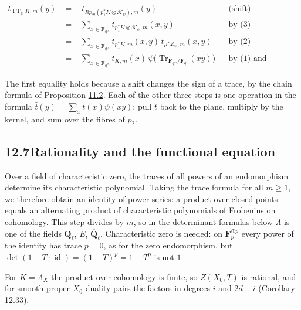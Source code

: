 \documentclass[11pt]{article}
\begin{document}
\[
\begin{aligned}
t_{\operatorname{FT}_\psi K,m}(y)
&=-\,t_{Rp_{2!}(p_1^*K\otimes\mathcal K_\psi),m}(y)
&&\text{(shift)}\\
&=-\sum_{x\in\mathbf F_{q^m}}t_{p_1^*K\otimes\mathcal K_\psi,m}(x,y)
&&\text{by (3)}\\
&=-\sum_{x\in\mathbf F_{q^m}}t_{p_1^*K,m}(x,y)\,t_{\mu^*\mathcal L_\psi,m}(x,y)
&&\text{by (2)}\\
&=-\sum_{x\in\mathbf F_{q^m}}t_{K,m}(x)\,
\psi\bigl(\operatorname{Tr}_{\mathbf F_{q^m}/\mathbf F_q}(xy)\bigr)
&&\text{by (1) and Lemma~16.1.1.}
\end{aligned}
\]

The first equality holds because a shift changes the sign of a trace, by the chain formula of Proposition \hyperref[bp176]{11.2}. Each of the other three steps is one operation in the formula \(\hat t(y)=\sum_xt(x)\psi(xy)\): pull \(t\) back to the plane, multiply by the kernel, and sum over the fibres of \(p_2\).


\subsection*{\texorpdfstring{12.7\quad Rationality and the functional equation}{12.7 Rationality and the functional equation}}
\label{bp312}%
\label{bp313}%
Over a field of characteristic zero, the traces of all powers of an endomorphism determine its characteristic polynomial. Taking the trace formula for all \(m\geq1\), we therefore obtain an identity of power series: a product over closed points equals an alternating product of characteristic polynomials of Frobenius on cohomology. This step divides by \(m\), so in the determinant formulas below \(\Lambda\) is one of the fields \(\mathbf Q_\ell\), \(E\), \(\overline{\mathbf Q}_\ell\). Characteristic zero is needed: on \(\mathbf F_p^{\oplus p}\) every power of the identity has trace \(p=0\), as for the zero endomorphism, but \(\det(1-T\cdot\operatorname{id})=(1-T)^p=1-T^p\) is not \(1\).

For \(K=\Lambda_X\) the product over cohomology is finite, so \(Z(X_0,T)\) is rational, and for smooth proper \(X_0\) duality pairs the factors in degrees \(i\) and \(2d-i\) (Corollary \hyperref[bp325]{12.33}).
\end{document}
